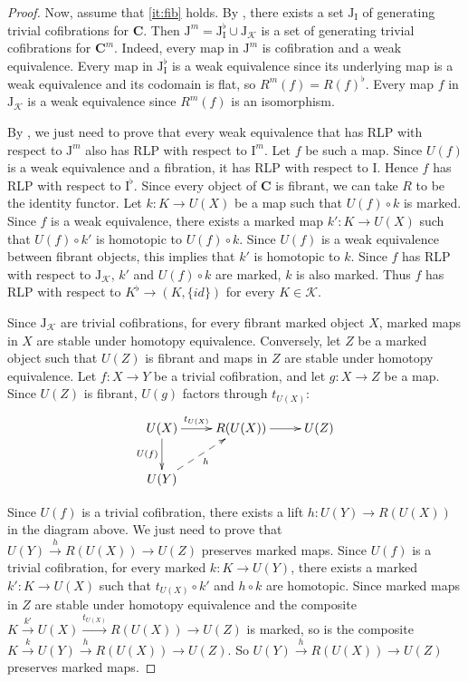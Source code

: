 \documentclass[reqno]{amsart}
\theoremstyle{definition}
\theoremstyle{remark}
\newcommand{\cat}[1]{\mathbf{#1}}
\newcommand{\C}{\cat{C}}
\newcommand{\I}{\mathrm{I}}
\newcommand{\J}{\mathrm{J}}
\numberwithin{figure}{section}
\begin{document}
\begin{proof}
Now, assume that \eqref{it:fib} holds.
By \cite[Corollary~3.2]{f-model-structures}, there exists a set $\J_\I$ of generating trivial cofibrations for $\C$.
Then $\J^m = \J_\I^\flat \cup \J_\mathcal{K}$ is a set of generating trivial cofibrations for $\C^m$.
Indeed, every map in $\J^m$ is cofibration and a weak equivalence.
Every map in $\J_\I^\flat$ is a weak equivalence since its underlying map is a weak equivalence and its codomain is flat, so $R^m(f) = R(f)^\flat$.
Every map $f$ in $\J_\mathcal{K}$ is a weak equivalence since $R^m(f)$ is an isomorphism.

By , we just need to prove that every weak equivalence that has RLP with respect to $\J^m$ also has RLP with respect to $\I^m$.
Let $f$ be such a map.
Since $U(f)$ is a weak equivalence and a fibration, it has RLP with respect to $\I$.
Hence $f$ has RLP with respect to $\I^\flat$.
Since every object of $\C$ is fibrant, we can take $R$ to be the identity functor.
Let $k : K \to U(X)$ be a map such that $U(f) \circ k$ is marked.
Since $f$ is a weak equivalence, there exists a marked map $k' : K \to U(X)$ such that $U(f) \circ k'$ is homotopic to $U(f) \circ k$.
Since $U(f)$ is a weak equivalence between fibrant objects, this implies that $k'$ is homotopic to $k$.
Since $f$ has RLP with respect to $\J_\mathcal{K}$, $k'$ and $U(f) \circ k$ are marked, $k$ is also marked.
Thus $f$ has RLP with respect to $K^\flat \to (K,\{id\})$ for every $K \in \mathcal{K}$.

Since $\J_\mathcal{K}$ are trivial cofibrations, for every fibrant marked object $X$, marked maps in $X$ are stable under homotopy equivalence.
Conversely, let $Z$ be a marked object such that $U(Z)$ is fibrant and maps in $Z$ are stable under homotopy equivalence.
Let $f : X \to Y$ be a trivial cofibration, and let $g : X \to Z$ be a map.
Since $U(Z)$ is fibrant, $U(g)$ factors through $t_{U(X)}$:
\[ \xymatrix{ U(X) \ar[r]^-{t_{U(X)}} \ar[d]_{U(f)} & R(U(X)) \ar[r] & U(Z) \\
              U(Y) \ar@{-->}[ur]_h
            } \]

Since $U(f)$ is a trivial cofibration, there exists a lift $h : U(Y) \to R(U(X))$ in the diagram above.
We just need to prove that $U(Y) \xrightarrow{h} R(U(X)) \to U(Z)$ preserves marked maps.
Since $U(f)$ is a trivial cofibration, for every marked $k : K \to U(Y)$, there exists a marked $k' : K \to U(X)$
such that $t_{U(X)} \circ k'$ and $h \circ k$ are homotopic.
Since marked maps in $Z$ are stable under homotopy equivalence and the composite $K \xrightarrow{k'} U(X) \xrightarrow{t_{U(X)}} R(U(X)) \to U(Z)$ is marked,
so is the composite $K \xrightarrow{k} U(Y) \xrightarrow{h} R(U(X)) \to U(Z)$.
So $U(Y) \xrightarrow{h} R(U(X)) \to U(Z)$ preserves marked maps.


\end{proof}
\end{document}
